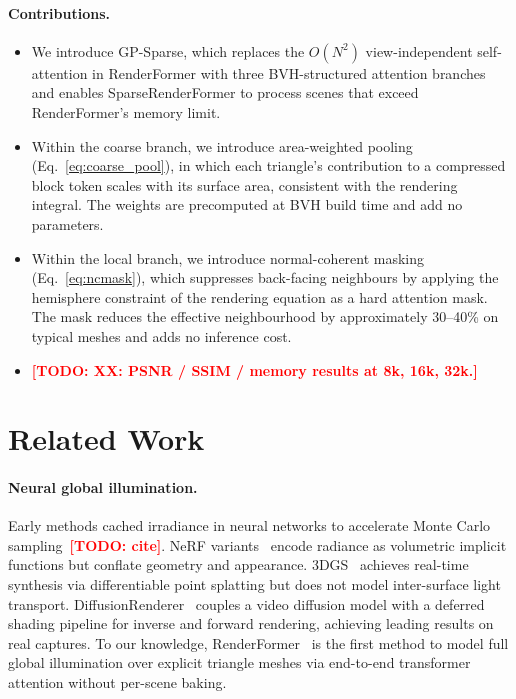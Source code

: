 \documentclass{egpubl}
\newcommand{\ours}{SparseRenderFormer\xspace}
\newcommand{\RF}{RenderFormer\xspace}
\newcommand{\todo}[1]{\textcolor{red}{\textbf{[TODO: #1]}}}
\begin{document}
\paragraph{Contributions.}
\begin{itemize}
  \item We introduce GP-Sparse, which replaces the $O(N^2)$
    view-independent self-attention in \RF with three BVH-structured
    attention branches and enables \ours to process scenes that exceed
    \RF's memory limit.
  \item Within the coarse branch, we introduce area-weighted pooling
    (Eq.~\ref{eq:coarse_pool}), in which each triangle's contribution
    to a compressed block token scales with its surface area, consistent
    with the rendering integral.
    The weights are precomputed at BVH build time and add no parameters.
  \item Within the local branch, we introduce normal-coherent masking
    (Eq.~\ref{eq:ncmask}), which suppresses back-facing neighbours by
    applying the hemisphere constraint of the rendering equation as a
    hard attention mask.
    The mask reduces the effective neighbourhood by approximately
    30--40\% on typical meshes and adds no inference cost.
  \item \todo{XX: PSNR / SSIM / memory results at 8k, 16k, 32k.}
\end{itemize}

\section{Related Work}
\label{sec:related}

\paragraph{Neural global illumination.}
Early methods cached irradiance in neural networks to accelerate Monte
Carlo sampling~\todo{cite}.
NeRF variants~\cite{mildenhall2020nerf} encode radiance as volumetric
implicit functions but conflate geometry and appearance.
3DGS~\cite{kerbl2023gaussian} achieves real-time synthesis via
differentiable point splatting but does not model inter-surface light
transport.
DiffusionRenderer~\cite{liang2025diffusionrenderer} couples a video
diffusion model with a deferred shading pipeline for inverse and forward
rendering, achieving leading results on real captures.
To our knowledge, \RF~\cite{zeng2025renderformer} is the first method to
model full global illumination over explicit triangle meshes via
end-to-end transformer attention without per-scene baking.
\end{document}
